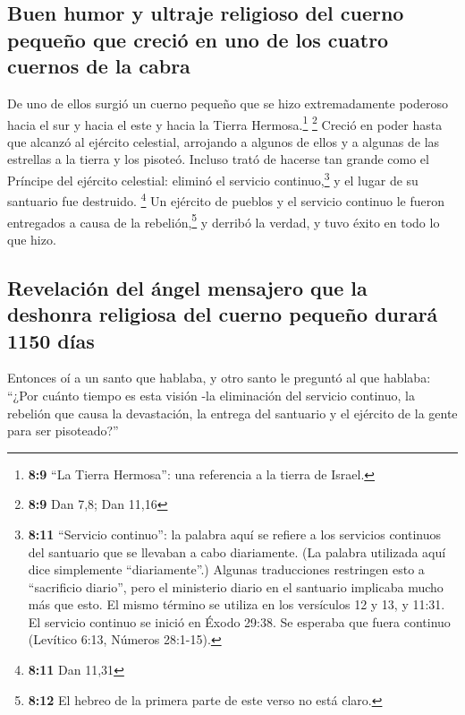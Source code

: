 \hypertarget{buen-humor-y-ultraje-religioso-del-cuerno-pequeuxf1o-que-creciuxf3-en-uno-de-los-cuatro-cuernos-de-la-cabra}{%
\subsection{Buen humor y ultraje religioso del cuerno pequeño que creció
en uno de los cuatro cuernos de la
cabra}\label{buen-humor-y-ultraje-religioso-del-cuerno-pequeuxf1o-que-creciuxf3-en-uno-de-los-cuatro-cuernos-de-la-cabra}}

 De uno de ellos surgió un cuerno pequeño que se hizo
extremadamente poderoso hacia el sur y hacia el este y hacia la Tierra
Hermosa.\footnote{\textbf{8:9} ``La Tierra Hermosa'': una referencia a
  la tierra de Israel.} \footnote{\textbf{8:9} Dan 7,8; Dan 11,16}
 Creció en poder hasta que alcanzó al ejército celestial,
arrojando a algunos de ellos y a algunas de las estrellas a la tierra y
los pisoteó.  Incluso trató de hacerse tan grande como el
Príncipe del ejército celestial: eliminó el servicio
continuo,\footnote{\textbf{8:11} ``Servicio continuo'': la palabra aquí
  se refiere a los servicios continuos del santuario que se llevaban a
  cabo diariamente. (La palabra utilizada aquí dice simplemente
  ``diariamente''.) Algunas traducciones restringen esto a ``sacrificio
  diario'', pero el ministerio diario en el santuario implicaba mucho
  más que esto. El mismo término se utiliza en los versículos 12 y 13, y
  11:31. El servicio continuo se inició en Éxodo 29:38. Se esperaba que
  fuera continuo (Levítico 6:13, Números 28:1-15).} y el lugar de su
santuario fue destruido. \footnote{\textbf{8:11} Dan 11,31}
 Un ejército de pueblos y el servicio continuo le fueron
entregados a causa de la rebelión,\footnote{\textbf{8:12} El hebreo de
  la primera parte de este verso no está claro.} y derribó la verdad, y
tuvo éxito en todo lo que hizo.

\hypertarget{revelaciuxf3n-del-uxe1ngel-mensajero-que-la-deshonra-religiosa-del-cuerno-pequeuxf1o-duraruxe1-1150-duxedas}{%
\subsection{Revelación del ángel mensajero que la deshonra religiosa del
cuerno pequeño durará 1150
días}\label{revelaciuxf3n-del-uxe1ngel-mensajero-que-la-deshonra-religiosa-del-cuerno-pequeuxf1o-duraruxe1-1150-duxedas}}

 Entonces oí a un santo que hablaba, y otro santo le
preguntó al que hablaba: ``¿Por cuánto tiempo es esta visión -la
eliminación del servicio continuo, la rebelión que causa la devastación,
la entrega del santuario y el ejército de la gente para ser pisoteado?''

